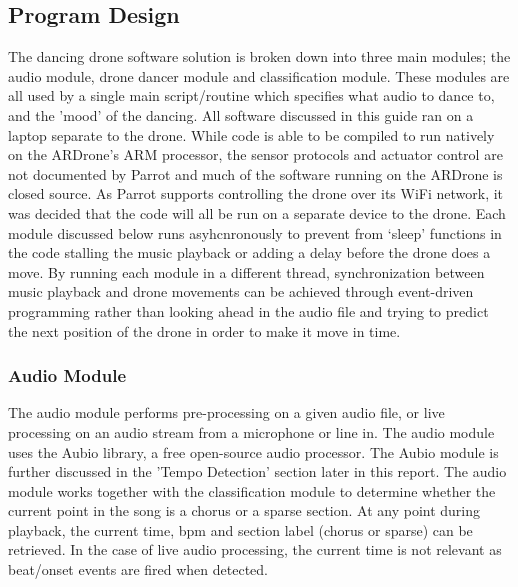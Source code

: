 \subsection{Program Design}

The dancing drone software solution is broken down into three main modules; the audio module, drone dancer
module and classification module. These modules are all used by a single main script/routine which specifies
what audio to dance to, and the 'mood' of the dancing. All software discussed in this guide ran on a laptop
separate to the drone. While code is able to be compiled to run natively on the ARDrone's ARM processor, the
sensor protocols and actuator control are not documented by Parrot and much of the software running on the
ARDrone is closed source. As Parrot supports controlling the drone over its WiFi network, it was decided that the
code will all be run on a separate device to the drone. Each module discussed below runs asyhcnronously to
prevent from `sleep' functions in the code stalling the music playback or adding a delay before the drone does a
move. By running each module in a different thread, synchronization between music playback and drone movements
can be achieved through event-driven programming rather than looking ahead in the audio file and trying to
predict the next position of the drone in order to make it move in time.\\

\subsubsection{Audio Module}
The audio module performs pre-processing on a given audio file, or live processing on an audio stream from a
microphone or line in. The audio module uses the Aubio library, a free open-source audio processor. The Aubio
module is further discussed in the 'Tempo Detection' section later in this report. The audio module works
together with the classification module to determine whether the current point in the song is a chorus or a
sparse section. At any point during playback, the current time, bpm and section label (chorus or sparse) can be
retrieved. In the case of live audio processing, the current time is not relevant as beat/onset events are fired
when detected. \\

